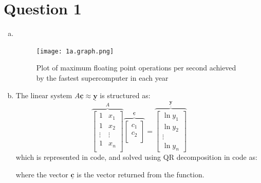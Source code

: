 \documentclass[11pt]{article}
\begin{document}


\section*{Question 1}

\begin{enumerate}[a)]
\item ~
  \begin{figure}[h!]
    \centering
    \texttt{[image: 1a.graph.png]}
    \caption{Plot of maximum floating point operations per second achieved by the fastest supercomputer in each year}
  \end{figure}

\item
  The linear system $A \mathbf{\underline{c}} \approx \mathbf{\underline{y}}$ is structured as:
  $$
  \overbrace{
    \begin{bmatrix}
      1&x_1 \\
      1&x_2 \\
      \vdots&\vdots \\
      1&x_n \\
    \end{bmatrix}
  }^A
  \overbrace{
    \begin{bmatrix}
      c_1 \\
      c_2 \\
    \end{bmatrix}
  }^{\mathbf{\underline{c}}}
  =
  \overbrace{
    \begin{bmatrix}
      \ln{y_1} \\
      \ln{y_2} \\
      \vdots \\
      \ln{y_n}
    \end{bmatrix}
  }^{\mathbf{\underline{y}}}
  $$
  which is represented in code, and solved using QR decomposition in code as:
  
  where the vector $\mathbf{\underline{c}}$ is the vector returned from the function.


\end{enumerate}
\end{document}
